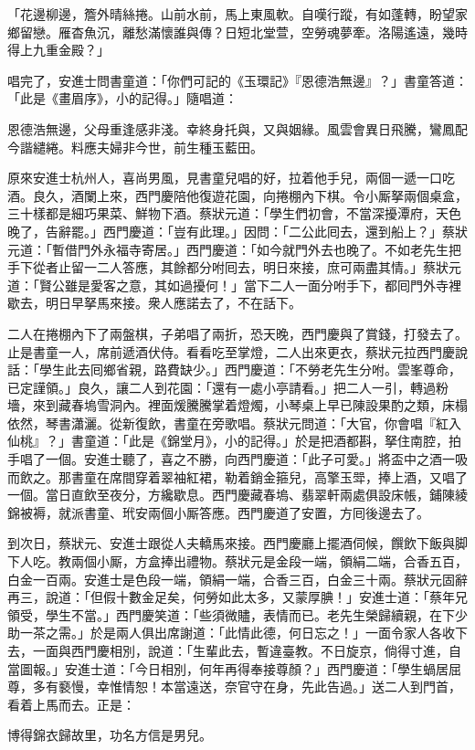 \begin{myquote} 
「花邊柳邊，簷外晴絲捲。山前水前，馬上東風軟。自嘆行蹤，有如蓬轉，盼望家鄉留戀。雁杳魚沉，離愁滿懷誰與傳？日短北堂萱，空勞魂夢牽。洛陽遙遠，幾時得上九重金殿？」
\end{myquote} 

唱完了，安進士問書童道：「你們可記的《玉環記》『恩德浩無邊』？」書童答道：「此是《畫眉序》，小的記得。」隨唱道：

\begin{myquote}
恩德浩無邊，父母重逢感非淺。幸終身托與，又與姻緣。風雲會異日飛騰，鸞鳳配今諧繾綣。料應夫婦非今世，前生種玉藍田。
\end{myquote}

原來安進士杭州人，喜尚男風，見書童兒唱的好，拉着他手兒，兩個一遞一口吃酒。良久，酒闌上來，西門慶陪他復遊花園，向捲棚內下棋。令小厮拏兩個桌盒，三十樣都是細巧果菜、鮮物下酒。蔡狀元道：「學生們初會，不當深擾潭府，天色晚了，告辭罷。」西門慶道：「豈有此理。」因問：「二公此囘去，還到船上？」蔡狀元道：「暫借門外永福寺寄居。」西門慶道：「如今就門外去也晚了。不如老先生把手下從者止留一二人答應，其餘都分咐囘去，明日來接，庶可兩盡其情。」蔡狀元道：「賢公雖是愛客之意，其如過擾何！」當下二人一面分咐手下，都囘門外寺裡歇去，明日早拏馬來接。衆人應諾去了，不在話下。

二人在捲棚內下了兩盤棋，子弟唱了兩折，恐天晚，西門慶與了賞錢，打發去了。止是書童一人，席前遞酒伏侍。看看吃至掌燈，二人出來更衣，蔡狀元拉西門慶說話：「學生此去囘鄉省親，路費缺少。」西門慶道：「不勞老先生分咐。雲峯尊命，已定謹領。」良久，讓二人到花園：「還有一處小亭請看。」把二人一引，轉過粉墻，來到藏春塢雪洞內。裡面煖騰騰掌着燈燭，小琴桌上早已陳設果酌之類，床榻依然，琴書瀟灑。從新復飲，書童在旁歌唱。蔡狀元問道：「大官，你會唱『紅入仙桃』？」書童道：「此是《錦堂月》，小的記得。」於是把酒都斟，拏住南腔，拍手唱了一個。安進士聽了，喜之不勝，向西門慶道：「此子可愛。」將盃中之酒一吸而飲之。那書童在席間穿着翠袖紅裙，勒着銷金箍兒，高擎玉斝，捧上酒，又唱了一個。當日直飲至夜分，方纔歇息。西門慶藏春塢、翡翠軒兩處俱設床帳，鋪陳綾錦被褥，就派書童、玳安兩個小厮答應。西門慶道了安置，方囘後邊去了。

到次日，蔡狀元、安進士跟從人夫轎馬來接。西門慶廳上擺酒伺候，饌飲下飯與脚下人吃。教兩個小厮，方盒捧出禮物。蔡狀元是金段一端，領絹二端，合香五百，白金一百兩。安進士是色段一端，領絹一端，合香三百，白金三十兩。蔡狀元固辭再三，說道：「但假十數金足矣，何勞如此太多，又蒙厚腆！」安進士道：「蔡年兄領受，學生不當。」西門慶笑道：「些須微贐，表情而已。老先生榮歸續親，在下少助一茶之需。」於是兩人俱出席謝道：「此情此德，何日忘之！」一面令家人各收下去，一面與西門慶相別，說道：「生輩此去，暫違臺教。不日旋京，倘得寸進，自當圖報。」安進士道：「今日相別，何年再得奉接尊顏？」西門慶道：「學生蝸居屈尊，多有褻慢，幸惟情恕！本當遠送，奈官守在身，先此告過。」送二人到門首，看着上馬而去。正是：

\begin{myquote}
博得錦衣歸故里，功名方信是男兒。
\end{myquote}

